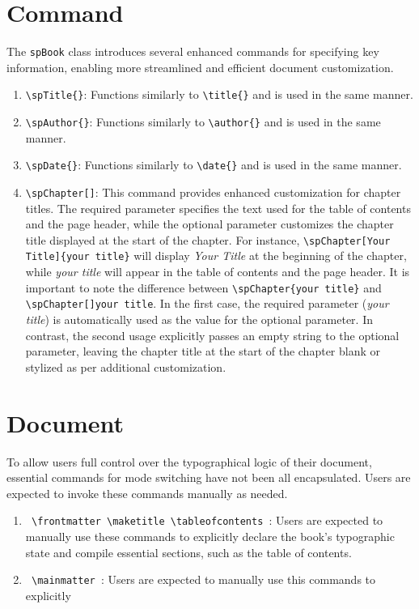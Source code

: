 \section{Command}
    The \texttt{spBook} class introduces several enhanced commands for specifying key information, enabling more streamlined and efficient document customization.
    \begin{enumerate}
        \item \texttt{\textbackslash spTitle\{\}}: Functions similarly to \texttt{\textbackslash title\{\}} and is used in the same manner.
        \item \texttt{\textbackslash spAuthor\{\}}: Functions similarly to \texttt{\textbackslash author\{\}} and is used in the same manner.
        \item \texttt{\textbackslash spDate\{\}}: Functions similarly to \texttt{\textbackslash date\{\}} and is used in the same manner.
        \item \texttt{\textbackslash spChapter[]{}}: This command provides enhanced customization for chapter titles. The required parameter specifies the text used for the table of contents and the page header, while the optional parameter customizes the chapter title displayed at the start of the chapter. For instance, \texttt{\textbackslash spChapter[Your Title]\{your title\}} will display \emph{Your Title} at the beginning of the chapter, while \emph{your title} will appear in the table of contents and the page header. It is important to note the difference between \texttt{\textbackslash spChapter\{your title\}} and \texttt{\textbackslash spChapter[]{your title}}. In the first case, the required parameter (\emph{your title}) is automatically used as the value for the optional parameter. In contrast, the second usage explicitly passes an empty string to the optional parameter, leaving the chapter title at the start of the chapter blank or stylized as per additional customization.
    \end{enumerate}

\section{Document}
    To allow users full control over the typographical logic of their document, essential commands for mode switching have not been all encapsulated. Users are expected to invoke these commands manually as needed.

    \begin{enumerate}
        \item \texttt{%
            \textbackslash frontmatter
            \textbackslash maketitle
            \textbackslash tableofcontents
        }: Users are expected to manually use these commands to explicitly declare the book's typographic state and compile essential sections, such as the table of contents.
        \item \texttt{%
            \textbackslash mainmatter
        }: Users are expected to manually use this commands to explicitly
    \end{enumerate}